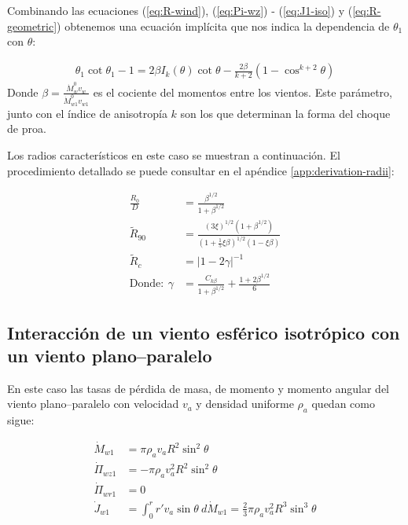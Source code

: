 Combinando las ecuaciones (\ref{eq:R-wind}), (\ref{eq:Pi-wz}) - (\ref{eq:J1-iso}) y (\ref{eq:R-geometric}) obtenemos una ecuación
implícita que nos indica la dependencia de $\theta_1$ con $\theta$:

\begin{align}
  \theta_1\cot\theta_1 -1 = 2\beta I_k(\theta)\cot\theta - \frac{2\beta}{k+2}\left(1 - \cos^{k+2}\theta\right) \label{eq:th1-th} 
\end{align}
Donde $\beta = \frac{\dot{M}^0_w v_w}{\dot{M}^0_{w1}v_{w1}}$ es el cociente del momentos entre los vientos. Este parámetro, junto con el
índice de anisotropía $k$ son los que determinan la forma del choque de proa. 

Los radios característicos en este caso se muestran a continuación. El procedimiento detallado se puede consultar en el apéndice
\ref{app:derivation-radii}:

\begin{align}
  \frac{R_0}{D} &= \frac{\beta^{1/2}}{1+\beta^{1/2}} \\
    \tilde{R}_{90} &= \frac{\left(3\xi\right)^{1/2}\left(1+\beta^{1/2}\right)}
                     {\left(1+\frac{1}{5}\xi\beta\right)^{1/2}\left(1-\xi\beta\right)} \label{eq:CRW-R90}\\
  \tilde{R}_c &= \left|1 - 2\gamma\right|^{-1} \label{eq:CRW-Rc}\\
  \mathrm{Donde:~} \gamma &= \frac{C_{k\beta}}{1+\beta^{1/2}} + \frac{1 + 2\beta^{1/2}}{6} 
\end{align}


\subsection{Interacción de un viento esférico isotrópico con un viento plano--paralelo}

En este caso las tasas de pérdida de masa, de momento y momento angular del viento plano--paralelo con velocidad $v_a$ y
densidad uniforme $\rho_a$ quedan como sigue:

\begin{align}
  \dot{M}_{w1} &= \pi \rho_a v_a R^2 \sin^2\theta\\
  \dot{\Pi}_{wz1} &= - \pi\rho_a v^2_a R^2 \sin^2\theta\\
  \dot{\Pi}_{wr1} &= 0 \\
  \dot{J}_{w1} &= \int^r_0 r'v_a \sin\theta~d\dot{M}_{w1} = \frac{2}{3}\pi\rho_a v_a^2 R^3 \sin^3\theta 
\end{align}

